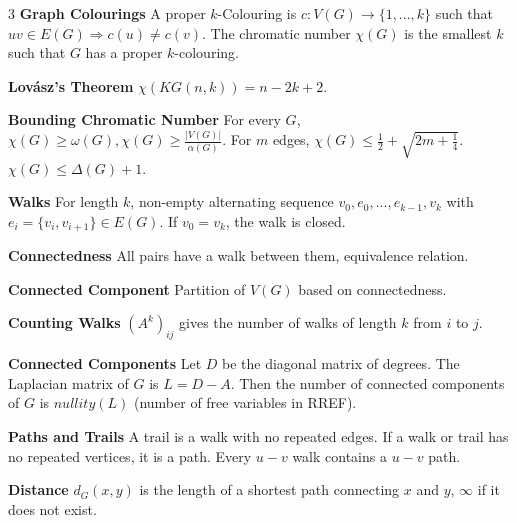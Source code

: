 \documentclass[10pt, landscape]{article}
\begin{document}
\begin{multicols*}{3}
\textbf{Graph Colourings} A proper $k$-Colouring is $c:V(G)\rightarrow\{1,...,k\}$ such that $uv \in E(G) \Rightarrow c(u) \neq c(v)$. The chromatic number $\chi(G)$ is the smallest $k$ such that $G$ has a proper $k$-colouring.

\textbf{Lovász's Theorem} $\chi(KG(n,k))=n-2k+2$.

\textbf{Bounding Chromatic Number} For every $G$, $\chi(G) \geq \omega(G), \chi(G) \geq \frac{|V(G)|}{\alpha(G)}$. For $m$ edges, $\chi(G) \leq \frac{1}{2}+\sqrt{2m+\frac{1}{4}}$. $\chi(G) \leq \Delta(G)+1$.

\textbf{Walks} For length $k$, non-empty alternating sequence $v_0,e_0,...,e_{k-1}, v_k$ with $e_i=\{v_i,v_{i+1}\}\in E(G)$. If $v_0=v_k$, the walk is closed.

\textbf{Connectedness} All pairs have a walk between them, equivalence relation.

\textbf{Connected Component} Partition of $V(G)$ based on connectedness.

\textbf{Counting Walks} $(A^k)_{ij}$ gives the number of walks of length $k$ from $i$ to $j$.


\textbf{Connected Components} Let $D$ be the diagonal matrix of degrees. The Laplacian matrix of $G$ is $L=D-A$. Then the number of connected components of $G$ is $nullity(L)$ (number of free variables in RREF).

\textbf{Paths and Trails} A trail is a walk with no repeated edges. If a walk or trail has no repeated vertices, it is a path. Every $u-v$ walk contains a $u-v$ path.

\textbf{Distance} $d_G(x, y)$ is the length of a shortest path connecting $x$ and $y$, $\infty$ if it does not exist.



\end{multicols*}
\end{document}
